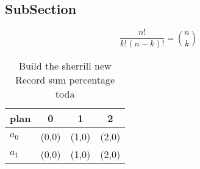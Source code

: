 \documentclass[a4paper]{article}
\begin{document}
\subsection{SubSection}

\[ \frac{n!}{k!(n-k)!} = \binom{n}{k} \]

\begin{table}
\begin{adjustbox}{width=0.6\columnwidth}
\begin{tabular}{|l|l|l|l|}
\hline
\textbf{plan} & \multicolumn{1}{c|}{\textbf{0}} & \multicolumn{1}{c|}{\textbf{1}} & \multicolumn{1}{c|}{\textbf{2}} \\ \hline
\textbf{$a_0$}  & (0,0) & (1,0) & (2,0) \\ \hline
\textbf{$a_1$}  & (0,0) & (1,0) & (2,0) \\ \hline
\end{tabular}
\end{adjustbox}
\caption{Build the sherrill new Record sum percentage toda
}
\end{table}
\end{document}
